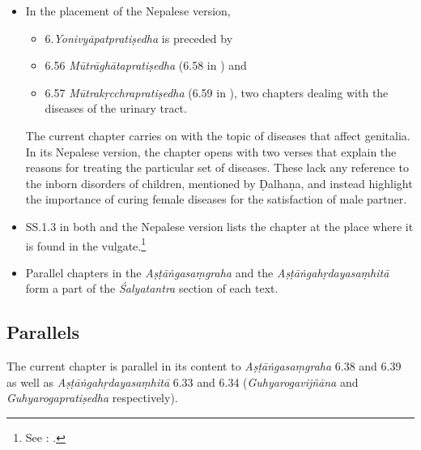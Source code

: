 \begin{itemize}
\begin{table}[t]
\begin{tabular}{lll}
           \bottomrule
       \end{tabular}
   \end{table}     
\item In the placement of the Nepalese version,
\begin{itemize}
    \item 6.\emph{Yonivyāpatpratiṣedha} is preceded by 
    \item 6.56 \emph{Mūtrāghātapratiṣedha} (6.58 in \cite{vulgate}) and 
    \item 6.57 \emph{Mūtrakṛcchrapratiṣedha} (6.59 in \cite{vulgate}), two 
    chapters
    dealing with the diseases of the urinary tract.  
    \end{itemize}
The current chapter carries on with the topic of diseases that affect
genitalia. In its Nepalese version, the chapter opens with two verses
that explain the reasons for treating the particular set of diseases.
These lack any reference to the inborn disorders of children, mentioned
by Ḍalhaṇa, and instead highlight the importance of curing female
diseases for the satisfaction of male partner.
        
\item SS.1.3 in both \cite{vulgate} and the Nepalese version lists the
chapter at the place where it is found in the vulgate.\footnote{See 
:
.}
        
        \item Parallel chapters in the \emph{Aṣṭāṅgasaṃgraha} and the
        \emph{Aṣṭāṅgahṛdayasaṃhitā} form a part of the \emph{Śalyatantra} section of 
        each
        text.
    \end{itemize} 
    
    \subsection{Parallels}
    
The current chapter is parallel in its content to \emph{Aṣṭāṅgasaṃgraha}
6.38 and 6.39 as well as \emph{Aṣṭāṅgahṛdayasaṃhitā} 6.33 and 6.34
(\emph{Guhyarogavijñāna} and \emph{Guhyarogapratiṣedha} respectively).%
    

